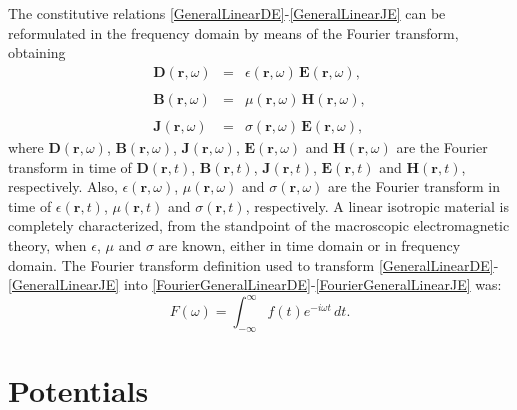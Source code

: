 The constitutive relations \eqref{GeneralLinearDE}-\eqref{GeneralLinearJE} can be reformulated in the frequency domain by means of the Fourier transform, obtaining
\begin{eqnarray}
    \mathbf{D}(\mathbf{r}, \omega) &=& \epsilon(\mathbf{r},\omega)\,\mathbf{E}(\mathbf{r},\omega), \label{FourierGeneralLinearDE}
    \\\nonumber
	\\[-0.25em]
	\mathbf{B}(\mathbf{r}, \omega) &=& \mu(\mathbf{r}, \omega)\,\mathbf{H}(\mathbf{r}, \omega),\label{FourierGeneralLinearBH}
	\\\nonumber
	\\[-0.25em]
	\mathbf{J}(\mathbf{r}, \omega) &=& \sigma(\mathbf{r}, \omega)\,\mathbf{E}(\mathbf{r}, \omega),\label{FourierGeneralLinearJE}
\end{eqnarray}
where $\mathbf{D}(\mathbf{r}, \omega)$, $\mathbf{B}(\mathbf{r}, \omega)$, $\mathbf{J}(\mathbf{r}, \omega)$, $\mathbf{E}(\mathbf{r}, \omega)$ and $\mathbf{H}(\mathbf{r}, \omega)$ are the Fourier transform in time of $\mathbf{D}(\mathbf{r},t)$, $\mathbf{B}(\mathbf{r},t)$, $\mathbf{J}(\mathbf{r},t)$, $\mathbf{E}(\mathbf{r},t)$ and $\mathbf{H}(\mathbf{r},t)$, respectively. Also, $\epsilon(\mathbf{r}, \omega)$, $\mu(\mathbf{r}, \omega)$ and $\sigma(\mathbf{r}, \omega)$ are the Fourier transform in time of $\epsilon(\mathbf{r},t)$, $\mu(\mathbf{r},t)$ and $\sigma(\mathbf{r},t)$, respectively. A linear isotropic material is completely characterized, from the standpoint of the macroscopic electromagnetic theory, when $\epsilon$, $\mu$ and $\sigma$ are known, either in time domain or in frequency domain. The Fourier transform definition used to transform \eqref{GeneralLinearDE}-\eqref{GeneralLinearJE} into \eqref{FourierGeneralLinearDE}-\eqref{FourierGeneralLinearJE} was:
\begin{equation}
	F(\omega) =\int^{\infty}_{-\infty} f(t)e^{-i\omega t} \, dt.\label{FourierTransformT}
\end{equation}

\section{Potentials}\label{sAVPotentials}

